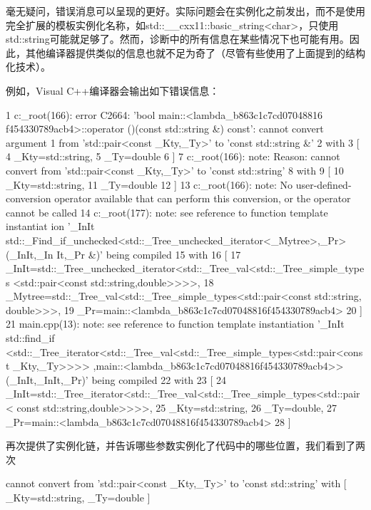 毫无疑问，错误消息可以呈现的更好。实际问题会在实例化之前发出，而不是使用完全扩展的模板实例化名称，如std::\_\_cxx11::basic\_string<char>，只使用std::string可能就足够了。然而，诊断中的所有信息在某些情况下也可能有用。因此，其他编译器提供类似的信息也就不足为奇了（尽管有些使用了上面提到的结构化技术）。

例如，Visual C++编译器会输出如下错误信息：

{\scriptsize
\begin{shell}
1  c:\tools_root\cl\inc\algorithm(166): error C2664: 'bool main::<lambda_b863c1c7cd07048816
   f454330789acb4>::operator ()(const std::string &) const': cannot convert argument 1 from
   'std::pair<const _Kty,_Ty>' to 'const std::string &'
2          with
3          [
4              _Kty=std::string,
5              _Ty=double
6          ]
7  c:\tools_root\cl\inc\algorithm(166): note: Reason: cannot convert from 'std::pair<const
   _Kty,_Ty>' to 'const std::string'
8          with
9          [
10             _Kty=std::string,
11             _Ty=double
12         ]
13 c:\tools_root\cl\inc\algorithm(166): note: No user-defined-conversion operator available
   that can perform this conversion, or the operator cannot be called
14 c:\tools_root\cl\inc\algorithm(177): note: see reference to function template instantiat
   ion '_InIt std::_Find_if_unchecked<std::_Tree_unchecked_iterator<_Mytree>,_Pr>(_InIt,_In
   It,_Pr &)' being compiled
15         with
16         [
17              _InIt=std::_Tree_unchecked_iterator<std::_Tree_val<std::_Tree_simple_types
                <std::pair<const std::string,double>>>>,
18              _Mytree=std::_Tree_val<std::_Tree_simple_types<std::pair<const std::string,
                double>>>,
19              _Pr=main::<lambda_b863c1c7cd07048816f454330789acb4>
20         ]
21 main.cpp(13): note: see reference to function template instantiation '_InIt std::find_if
   <std::_Tree_iterator<std::_Tree_val<std::_Tree_simple_types<std::pair<const _Kty,_Ty>>>>
   ,main::<lambda_b863c1c7cd07048816f454330789acb4>>(_InIt,_InIt,_Pr)' being compiled
22         with
23         [
24             _InIt=std::_Tree_iterator<std::_Tree_val<std::_Tree_simple_types<std::pair<
               const std::string,double>>>>,
25             _Kty=std::string,
26             _Ty=double,
27             _Pr=main::<lambda_b863c1c7cd07048816f454330789acb4>
28         ]
\end{shell}
}

再次提供了实例化链，并告诉哪些参数实例化了代码中的哪些位置，我们看到了两次

{\scriptsize
\begin{shell}
cannot convert from 'std::pair<const _Kty,_Ty>' to 'const std::string'
with
[
    _Kty=std::string,
    _Ty=double
]
\end{shell}
}


